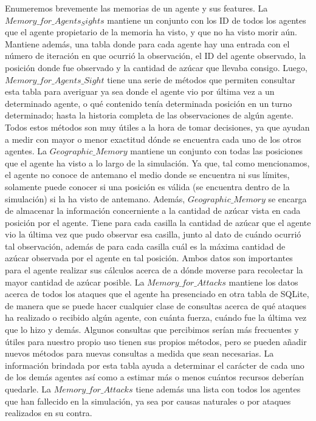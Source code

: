 \documentclass[11pt]{article}
\begin{document}
Enumeremos brevemente las memorias de un agente y sus features.
La $Memory\_for\_Agents_Sights$ mantiene un conjunto con los ID de todos los agentes que el agente propietario de la memoria ha visto, y que no ha visto morir aún. Mantiene además, una tabla donde para cada agente hay una entrada con el número de iteración en que ocurrió la observación, el ID del agente observado, la posición donde fue observado y la cantidad de azúcar que llevaba consigo. Luego, $Memory\_for\_Agents\_Sight$ tiene una serie de métodos que permiten consultar esta tabla para averiguar ya sea donde el agente vio por última vez a un determinado agente, o qué contenido tenía determinada posición en un turno determinado; hasta la historia completa de las observaciones de algún agente. Todos estos métodos son muy útiles a la hora de tomar decisiones, ya que ayudan a medir con mayor o menor exactitud dónde se encuentra cada uno de los otros agentes.
La $Geographic\_Memory$ mantiene un conjunto con todas las posiciones que el agente ha visto a lo largo de la simulación. Ya que, tal como mencionamos, el agente no conoce de antemano el medio donde se encuentra ni sus límites, solamente puede conocer si una posición es válida (se encuentra dentro de la simulación) si la ha visto de antemano. Además, $Geographic\_Memory$ se encarga de almacenar la información concerniente a la cantidad de azúcar vista en cada posición por el agente. Tiene para cada casilla la cantidad de azúcar que el agente vio la última vez que pudo observar esa casilla, junto al dato de cuándo ocurrió tal observación, además de para cada casilla cuál es la máxima cantidad de azúcar observada por el agente en tal posición. Ambos datos son importantes para el agente realizar sus cálculos acerca de a dónde moverse para recolectar la mayor cantidad de azúcar posible.
La $Memory\_for\_Attacks$ mantiene los datos acerca de todos los ataques que el agente ha presenciado en otra tabla de SQLite, de manera que se puede hacer cualquier clase de consultas acerca de qué ataques ha realizado o recibido algún agente, con cuánta fuerza, cuándo fue la última vez que lo hizo y demás. Algunos consultas que percibimos serían más frecuentes y útiles para nuestro propio uso tienen sus propios métodos, pero se pueden añadir nuevos métodos para nuevas consultas a medida que sean necesarias. La información brindada por esta tabla ayuda a determinar el carácter de cada uno de los demás agentes así como a estimar más o menos cuántos recursos deberían quedarle. La $Memory\_for\_Attacks$ tiene además una lista con todos los agentes que han fallecido en la simulación, ya sea por causas naturales o por ataques realizados en su contra.
\end{document}
